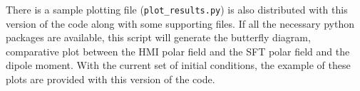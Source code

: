There is a sample plotting file (\texttt{plot\_results.py}) is also distributed with this version of the code along with some supporting files. If all the necessary python packages are available, this script will generate the butterfly diagram, comparative plot between the HMI polar field and the SFT polar field and the dipole moment. With the current set of initial conditions, the example of these plots are provided with this version of the code. 
